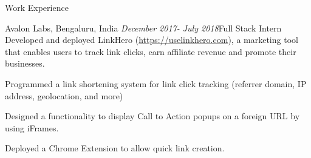 \documentclass{resume} %
\begin{document}

\begin{rSection}{Work Experience}

\begin{rSubsection}{Avalon Labs, Bengaluru, India }{\em December 2017- July 2018}{Full Stack Intern}{}
Developed and deployed LinkHero (\url{https://uselinkhero.com}), a marketing tool that enables users to track link clicks, earn affiliate revenue and promote their businesses.
\item
Programmed a link shortening system for link click tracking (referrer domain, IP address, geolocation, and more)
\item 
Designed a functionality to display Call to Action popups on a foreign URL by using iFrames.
\item
Deployed a Chrome Extension to allow quick link creation.
\end{rSubsection}
\end{rSection}
\end{document}
